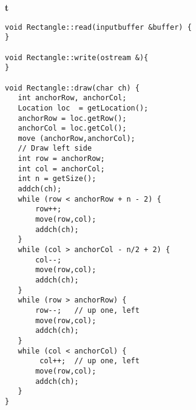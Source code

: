 \documentclass[10pt,twocolumn]{article}
\begin{document}
\bc
\large\bf t
\ec
\small
\begin{verbatim}
void Rectangle::read(inputbuffer &buffer) {
}

void Rectangle::write(ostream &){
}

void Rectangle::draw(char ch) {
   int anchorRow, anchorCol;
   Location loc  = getLocation();
   anchorRow = loc.getRow();
   anchorCol = loc.getCol();
   move (anchorRow,anchorCol);
   // Draw left side
   int row = anchorRow;
   int col = anchorCol;
   int n = getSize();
   addch(ch);
   while (row < anchorRow + n - 2) {
       row++;
       move(row,col);
       addch(ch);
   }
   while (col > anchorCol - n/2 + 2) {
       col--;
       move(row,col);
       addch(ch);
   }
   while (row > anchorRow) {
       row--;   // up one, left
       move(row,col);
       addch(ch);
   }
   while (col < anchorCol) {
        col++;  // up one, left
       move(row,col);
       addch(ch);
   }
}

\end{verbatim}
\end{document}
